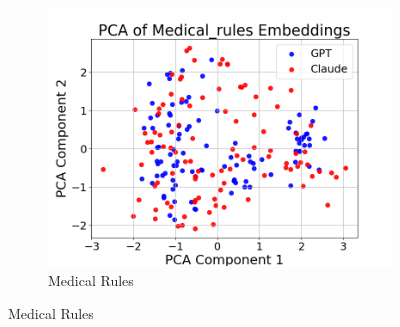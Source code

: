 \documentclass{article}
\begin{document}
\begin{figure}[ht]
\begin{subfigure}[b]{0.32\textwidth}
        \centering
        \includegraphics[width=\textwidth]{figures/PCA_plots/Medical_rules_embeddings.png}
        \caption{Medical Rules}
        \label{fig:medical_rules}
    \end{subfigure}
    

\end{figure}
\end{document}
